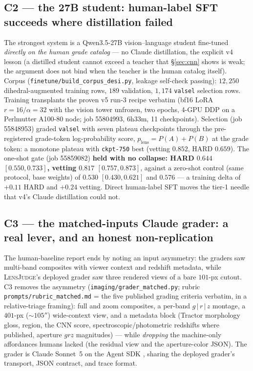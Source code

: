 \documentclass[11pt,letterpaper]{article}
\newcommand{\lj}{\textsc{LensJudge}}
\newcommand{\plens}{\ensuremath{p_{\mathrm{lens}}}}
\begin{document}
\subsection{C2 --- the 27B student: human-label SFT succeeds where distillation
failed}\label{sec:student}
The strongest system is a Qwen3.5-27B vision--language student fine-tuned
\emph{directly on the human grade catalog} --- no Claude distillation, the explicit v4
lesson (a distilled student cannot exceed a teacher that \S\ref{sec:cnn} shows is weak;
the argument does not bind when the teacher is the human catalog itself). Corpus
(\texttt{finetune/build\_corpus\_desi.py}, leakage self-check passing): $12{,}250$
dihedral-augmented training rows, $189$ validation, $1{,}174$ \texttt{valsel} selection
rows. Training transplants the proven v5 run-3 recipe verbatim (bf16 LoRA
$r{=}16/\alpha{=}32$ with the vision tower unfrozen, two epochs, 4-GPU DDP on a
Perlmutter A100-80 node; job 55804993, 6h33m, 11 checkpoints). Selection (job 55848953)
graded \texttt{valsel} with seven plateau checkpoints through the pre-registered
grade-token log-probability score, $\plens=P(A)+P(B)$ at the grade token: a monotone
plateau with \texttt{ckpt-750} best (vetting $0.852$, HARD $0.659$). The one-shot gate
(job 55859082) \textbf{held with no collapse: HARD $0.644$ $[0.550,0.733]$, vetting
$0.817$ $[0.757,0.873]$}, against a zero-shot control (same protocol, base weights) of
$0.530$ $[0.430,0.621]$ and $0.576$ --- a training delta of $+0.11$ HARD and $+0.24$
vetting. Direct human-label SFT moves the tier-1 needle that v4's Claude distillation
could not.

\subsection{C3 --- the matched-inputs Claude grader: a real lever, and an honest
non-replication}\label{sec:cthree}
The human-baseline report ends by noting an input asymmetry: the graders saw multi-band
composites with viewer context and redshift metadata, while \lj{}'s deployed grader saw
three rendered views of a bare $101$-px cutout. C3 removes the asymmetry
(\texttt{imaging/grader\_matched.py}; rubric \texttt{prompts/rubric\_matched.md} = the
five published grading criteria verbatim, in a relative-triage framing): full and zoom
composites, a per-band $g\,|\,r\,|\,z$ montage, a $401$-px ($\sim$$105''$) wide-context
view, and a metadata block (Tractor morphology gloss, region, the CNN score,
spectroscopic/photometric redshifts where published, aperture $grz$ magnitudes) ---
while \emph{dropping} the machine-only affordances humans lacked (the residual view and
the aperture-color JSON). The grader is Claude Sonnet~5 on the Agent SDK
\citep{claudeagentsdk}, sharing the deployed grader's transport, JSON contract, and
trace format.
\end{document}
